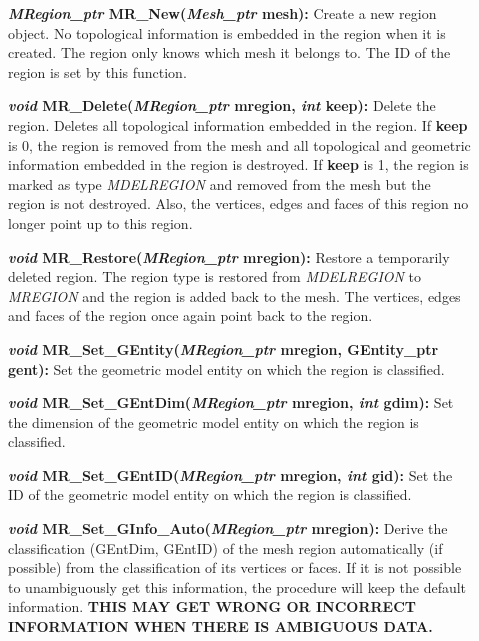 \documentclass[12pt]{article}
\begin{document}
\begin{description}
\item[]{\bf {\em MRegion\_ptr} MR\_New({\em Mesh\_ptr}
    mesh):} Create a new region object. No topological information is
  embedded in the region when it is created. The region only knows
  which mesh it belongs to. The ID of the region is set by this
  function.

\item[]{\bf {\em void} MR\_Delete({\em MRegion\_ptr} mregion,
    {\em int} keep):} Delete the region. Deletes all topological
  information embedded in the region. If {\bf keep} is 0, the
  region is removed from the mesh and all topological and geometric
  information embedded in the region is destroyed. If {\bf keep} is
  1, the region is marked as type {\em MDELREGION} and removed from
  the mesh but the region is not destroyed. Also, the vertices, edges
  and faces of this region no longer point up to this region.
    
\item[]{\bf {\em void} MR\_Restore({\em MRegion\_ptr}
    mregion):} Restore a temporarily deleted region. The region type
  is restored from {\em MDELREGION} to {\em MREGION} and the
  region is added back to the mesh. The vertices, edges and faces of
  the region once again point back to the region.

\item[]
  
\item[]{\bf {\em void} MR\_Set\_GEntity({\em MRegion\_ptr}
    mregion, GEntity\_ptr gent):} Set the geometric model entity on
  which the region is classified.
  
\item[]{\bf {\em void} MR\_Set\_GEntDim({\em MRegion\_ptr}
    mregion, {\em int} gdim):} Set the dimension of the geometric
  model entity on which the region is classified.
  
\item[]{\bf {\em void} MR\_Set\_GEntID({\em MRegion\_ptr}
    mregion, {\em int} gid):} Set the ID of the geometric model
  entity on which the region is classified.
  
\item[]{\bf {\em void} MR\_Set\_GInfo\_Auto({\em MRegion\_ptr} mregion):}
  Derive the classification (GEntDim, GEntID) of the mesh region
  automatically (if possible) from the classification of its
  vertices or faces. If it is not possible to unambiguously get this
  information, the procedure will keep the default information. {\bf THIS
  MAY GET WRONG OR INCORRECT INFORMATION WHEN THERE IS AMBIGUOUS
  DATA.}



\end{description}
\end{document}
